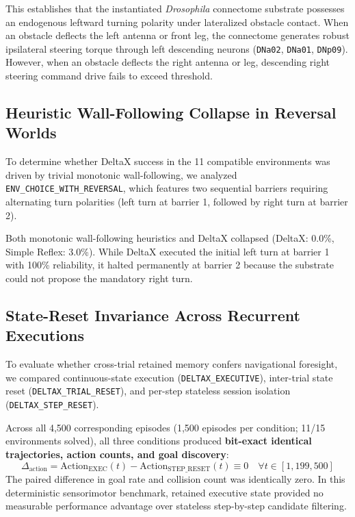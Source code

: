 \documentclass[10pt,letterpaper]{article}
\begin{document}
This establishes that the instantiated \textit{Drosophila} connectome substrate possesses an endogenous leftward turning polarity under lateralized obstacle contact. When an obstacle deflects the left antenna or front leg, the connectome generates robust ipsilateral steering torque through left descending neurons (\texttt{DNa02}, \texttt{DNa01}, \texttt{DNp09}). However, when an obstacle deflects the right antenna or leg, descending right steering command drive fails to exceed threshold.

\subsection{Heuristic Wall-Following Collapse in Reversal Worlds}

To determine whether DeltaX success in the 11 compatible environments was driven by trivial monotonic wall-following, we analyzed \texttt{ENV\_CHOICE\_WITH\_REVERSAL}, which features two sequential barriers requiring alternating turn polarities (left turn at barrier 1, followed by right turn at barrier 2). 

Both monotonic wall-following heuristics and DeltaX collapsed (DeltaX: 0.0\%, Simple Reflex: 3.0\%). While DeltaX executed the initial left turn at barrier 1 with 100\% reliability, it halted permanently at barrier 2 because the substrate could not propose the mandatory right turn.

\subsection{State-Reset Invariance Across Recurrent Executions}

To evaluate whether cross-trial retained memory confers navigational foresight, we compared continuous-state execution (\texttt{DELTAX\_EXECUTIVE}), inter-trial state reset (\texttt{DELTAX\_TRIAL\_RESET}), and per-step stateless session isolation (\texttt{DELTAX\_STEP\_RESET}).

Across all 4,500 corresponding episodes (1,500 episodes per condition; 11/15 environments solved), all three conditions produced \textbf{bit-exact identical trajectories, action counts, and goal discovery}:
\begin{equation}
\Delta_{\text{action}} = \text{Action}_{\text{EXEC}}(t) - \text{Action}_{\text{STEP\_RESET}}(t) \equiv 0 \quad \forall t \in [1, 199,500]
\end{equation}
The paired difference in goal rate and collision count was identically zero. In this deterministic sensorimotor benchmark, retained executive state provided no measurable performance advantage over stateless step-by-step candidate filtering.
\end{document}
